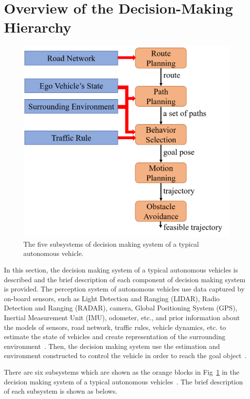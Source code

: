 \documentclass[conference]{IEEEtran}
\begin{document}
\section{Overview of the Decision-Making Hierarchy}

\begin{figure}[htbp]
	\centering
	\includegraphics[width=1\columnwidth]{./picture/architecture.png}
	\caption{\label{architecture}
		The five subsystems of decision making system of a typical autonomous vehicle.}
\end{figure}

In this section, the decision making system of a typical autonomous vehicles is described and the brief description of each component of decision making system is provided. The perception system of autonomous vehicles use data captured by on-board sensors, such as Light Detection and Ranging (LIDAR), Radio Detection and Ranging (RADAR), camera, Global Positioning System (GPS), Inertial Measurement Unit (IMU), odometer, etc., and prior information about the models of sensors, road network, traffic rules, vehicle dynamics, etc. to estimate the state of vehicles and create representation of the surrounding environment~\cite{self_driving}. Then, the decision making system use the estimation and environment constructed to control the vehicle in order to reach the goal object~\cite{Brian2016}. 

There are six subsystems which are shown as the orange blocks in Fig~\ref{architecture} in the decision making system of a typical autonomous vehicles~\cite{self_driving}. The brief description of each subsystem is shown as belows.
\end{document}
